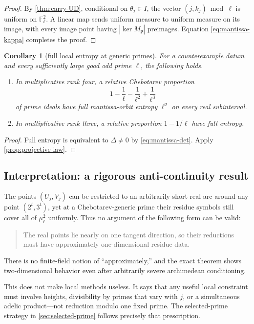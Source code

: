 \documentclass[11pt,oneside]{article}
\newtheorem{corollary}[theorem]{Corollary}
\theoremstyle{definition}
\theoremstyle{remark}
\newcommand{\F}{\mathbb{F}}
\begin{document}
\begin{proof}
By \cref{thm:carry-UD}, conditional on $\theta_j\in I$, the vector
$(j,k_j)\bmod\ell$ is uniform on $\F_\ell^2$.  A linear map sends uniform
measure to uniform measure on its image, with every image point having
$|\ker M_{\mathfrak p}|$ preimages.  Equation
\eqref{eq:mantissa-kappa} completes the proof.
\end{proof}

\begin{corollary}[full local entropy at generic primes]\label{cor:full-entropy}
For a counterexample datum and every sufficiently large good odd prime
$\ell$, the following holds.
\begin{enumerate}
\item In multiplicative rank four, a relative Chebotarev proportion
\[
 1-\frac1\ell-\frac1{\ell^2}+\frac1{\ell^3}
\]
of prime ideals have full mantissa-orbit entropy $\ell^2$ on every real
subinterval.
\item In multiplicative rank three, a relative proportion $1-1/\ell$ have
full entropy.
\end{enumerate}
\end{corollary}

\begin{proof}
Full entropy is equivalent to $\Delta\ne0$ by
\eqref{eq:mantissa-det}.  Apply \cref{prop:projective-law}.
\end{proof}

\subsection{Interpretation: a rigorous anti-continuity result}

The points $(U_j,V_j)$ can be restricted to an arbitrarily short real arc
around any point $(2^t,3^t)$, yet at a Chebotarev-generic prime their residue
symbols still cover all of $\mu_\ell^2$ uniformly.  Thus no argument of the
following form can be valid:
\begin{quote}
The real points lie nearly on one tangent direction, so their reductions
must have approximately one-dimensional residue data.
\end{quote}
There is no finite-field notion of ``approximately,'' and the exact theorem
shows two-dimensional behavior even after arbitrarily severe archimedean
conditioning.

This does not make local methods useless.  It says that any useful local
constraint must involve heights, divisibility by primes that vary with $j$,
or a simultaneous adelic product---not reduction modulo one fixed prime.
The selected-prime strategy in \cref{sec:selected-prime} follows precisely
that prescription.
\end{document}
